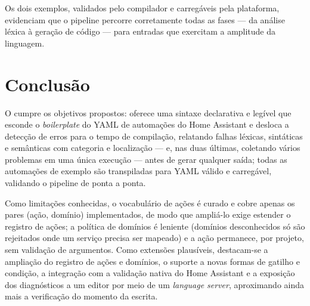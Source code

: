 \documentclass[12pt]{article}
\renewcommand\texttt[1]{\svtt{\small#1}}
\begin{document}
Os dois exemplos, validados pelo compilador e carregáveis pela
plataforma, evidenciam que o pipeline percorre corretamente todas as
fases --- da análise léxica à geração de código --- para entradas que
exercitam a amplitude da linguagem.

\section{Conclusão}

O \texttt{jass} cumpre os objetivos propostos: oferece uma sintaxe
declarativa e legível que esconde o \emph{boilerplate} do YAML de
automações do Home Assistant e desloca a detecção de erros para o tempo
de compilação, relatando falhas léxicas, sintáticas e semânticas com
categoria e localização --- e, nas duas últimas, coletando vários
problemas em uma única execução --- antes de gerar qualquer saída; todas
as automações de exemplo são transpiladas para YAML válido e carregável,
validando o pipeline de ponta a ponta.

Como limitações conhecidas, o
vocabulário de ações é curado e cobre apenas os pares (ação, domínio)
implementados, de modo que ampliá-lo exige estender o registro de ações;
a política de domínios é leniente (domínios desconhecidos só são
rejeitados onde um serviço precisa ser mapeado) e a ação \texttt{call}
permanece, por projeto, sem validação de argumentos. Como extensões
plausíveis, destacam-se a ampliação do registro de ações e domínios, o
suporte a novas formas de gatilho e condição, a integração com a
validação nativa do Home Assistant e a exposição dos diagnósticos a um
editor por meio de um \emph{language server}, aproximando ainda mais a
verificação do momento da escrita.




\end{document}
